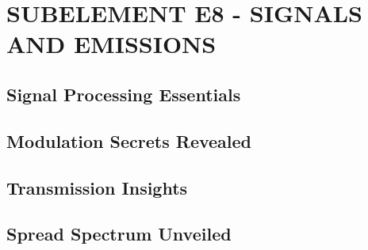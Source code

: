 \documentclass[12pt]{book}
\begin{document}
\chapter{SUBELEMENT E8 - SIGNALS AND EMISSIONS}
\section{Signal Processing Essentials}











\section{Modulation Secrets Revealed}











\section{Transmission Insights}















\section{Spread Spectrum Unveiled}











\end{document}
